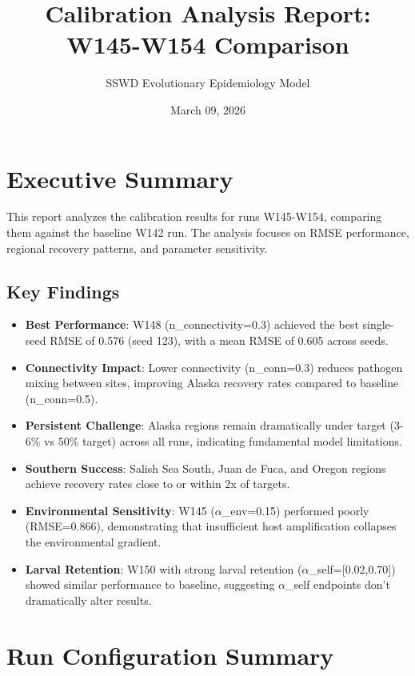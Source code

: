 \documentclass[11pt]{article}
\title{Calibration Analysis Report: W145-W154 Comparison}
\author{SSWD Evolutionary Epidemiology Model}
\date{March 09, 2026}
\begin{document}
\maketitle

\section{Executive Summary}

This report analyzes the calibration results for runs W145-W154, comparing them against the baseline W142 run. The analysis focuses on RMSE performance, regional recovery patterns, and parameter sensitivity.

\subsection{Key Findings}

\begin{itemize}
\item \textbf{Best Performance}: W148 (n\_connectivity=0.3) achieved the best single-seed RMSE of 0.576 (seed 123), with a mean RMSE of 0.605 across seeds.
\item \textbf{Connectivity Impact}: Lower connectivity (n\_conn=0.3) reduces pathogen mixing between sites, improving Alaska recovery rates compared to baseline (n\_conn=0.5).
\item \textbf{Persistent Challenge}: Alaska regions remain dramatically under target (3-6\% vs 50\% target) across all runs, indicating fundamental model limitations.
\item \textbf{Southern Success}: Salish Sea South, Juan de Fuca, and Oregon regions achieve recovery rates close to or within 2x of targets.
\item \textbf{Environmental Sensitivity}: W145 ($\alpha$\_env=0.15) performed poorly (RMSE=0.866), demonstrating that insufficient host amplification collapses the environmental gradient.
\item \textbf{Larval Retention}: W150 with strong larval retention ($\alpha$\_self=[0.02,0.70]) showed similar performance to baseline, suggesting $\alpha$\_self endpoints don't dramatically alter results.
\end{itemize}

\section{Run Configuration Summary}
\end{document}
